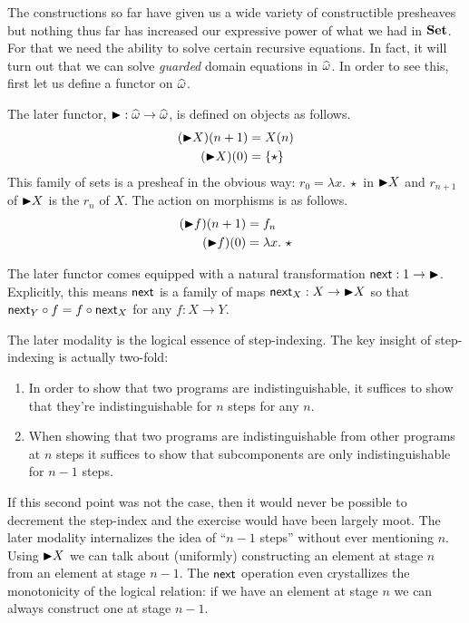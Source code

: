 The constructions so far have given us a wide variety of constructible
presheaves but nothing thus far has increased our expressive power of
what we had in $\mathbf{Set}$. For that we need the ability to solve certain
recursive equations. In fact, it will turn out that we can solve
\emph{guarded} domain equations in $\widehat{\omega}$. In order to
see this, first let us define a functor on $\widehat{\omega}$.
\begin{defn}
  The later functor,
  ${\blacktriangleright} : \widehat{\omega} \to \widehat{\omega}$, is defined
  on objects as follows.
  \begin{align*}
    ({\blacktriangleright} X)(n + 1) &= X(n)\\
    ({\blacktriangleright} X)(0) &= \{\star\}
  \end{align*}
  This family of sets is a presheaf in the obvious way:
  $r_0 = \lambda x.\ \star$ in ${\blacktriangleright} X$ and $r_{n + 1}$ of
  ${\blacktriangleright} X$ is the $r_n$ of $X$. The action on morphisms is as
  follows.
  \begin{align*}
    ({\blacktriangleright} f)(n + 1) &= f_n\\
    ({\blacktriangleright} f)(0) &= \lambda x.\ \star
  \end{align*}

  The later functor comes equipped with a natural transformation
  $\mathsf{next} : 1 \to {\blacktriangleright}$. Explicitly, this means $\mathsf{next}$ is a family
  of maps $\mathsf{next}_X : X \to {\blacktriangleright} X$ so that
  $\mathsf{next}_Y \circ f = f \circ \mathsf{next}_X$ for any $f : X \to Y$.
\end{defn}
The later modality is the logical essence of step-indexing.
The key insight of step-indexing is actually two-fold:
\begin{enumerate}
\item In order to show that two programs are indistinguishable, it
  suffices to show that they're indistinguishable for $n$ steps for
  any $n$.
\item When showing that two programs are indistinguishable from other
  programs at $n$ steps it suffices to show that subcomponents are
  only indistinguishable for $n - 1$ steps.
\end{enumerate}
If this second point was not the case, then it would never be possible
to decrement the step-index and the exercise would have been largely
moot. The later modality internalizes the idea of ``$n - 1$ steps''
without ever mentioning $n$. Using ${\blacktriangleright} X$ we can talk about
(uniformly) constructing an element at stage $n$ from an element at
stage $n - 1$. The $\mathsf{next}$ operation even crystallizes the
monotonicity of the logical relation: if we have an element at stage
$n$ we can always construct one at stage $n - 1$.


